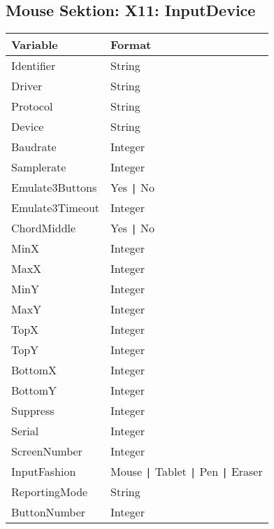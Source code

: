 \subsection{Mouse Sektion: X11: InputDevice}
\begin{tabular}[h]{|p{5cm}|p{7cm}|}
 \hline
 \textbf{Variable}     & \textbf{Format}        \\
 \hline
 Identifier       & String                             \\
 Driver           & String                             \\
 Protocol         & String                             \\
 Device           & String                             \\
 Baudrate         & Integer                            \\
 Samplerate       & Integer                            \\
 Emulate3Buttons  & Yes \verb+|+ No                    \\
 Emulate3Timeout  & Integer                            \\
 ChordMiddle      & Yes \verb+|+ No                    \\
 MinX             & Integer                            \\
 MaxX             & Integer                            \\
 MinY             & Integer                            \\
 MaxY             & Integer                            \\
 TopX             & Integer                            \\
 TopY             & Integer                            \\
 BottomX          & Integer                            \\
 BottomY          & Integer                            \\
 Suppress         & Integer                            \\
 Serial           & Integer                            \\
 ScreenNumber     & Integer                            \\
 InputFashion     & Mouse \verb+|+ Tablet \verb+|+ Pen \verb+|+ Eraser \\
 ReportingMode    & String                             \\
 ButtonNumber     & Integer                            \\

\end{tabular}
